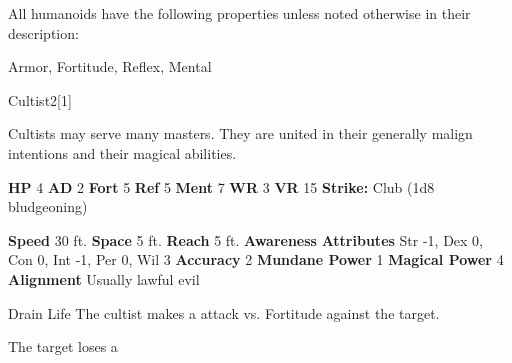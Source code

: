         All humanoids have the following properties unless noted otherwise in their description:
        
    
     Armor,
     Fortitude,
     Reflex,
     Mental
  
  
      
  \begin{monsection}{Cultist}{2}[1]
    \vspace{-1em}\vspace{-1em}
    \vspace{0em}

    
      Cultists may serve many masters.
      They are united in their generally malign intentions and their magical abilities.
    
    

    \begin{spellcontent}
      \begin{spelltargetinginfo}
        \pari \textbf{HP} 4 \monsep
          \textbf{AD} 2 \monsep
          \textbf{Fort} 5 \monsep
          \textbf{Ref} 5 \monsep
          \textbf{Ment} 7
        \pari \textbf{WR} 3 \monsep
        \textbf{VR} 15
        \pari \textbf{Strike:}
            Club  (1d8 bludgeoning)
      \end{spelltargetinginfo}
    \end{spellcontent}
    \begin{monsterfooter}
      \pari \textbf{Speed} 30 ft. \monsep
        \textbf{Space} 5 ft. \monsep
        \textbf{Reach} 5 ft.
      \pari \textbf{Awareness} 
      \pari \textbf{Attributes}
        Str -1, Dex 0,
        Con 0, Int -1,
        Per 0, Wil 3
      \pari \textbf{Accuracy} 2 \monsep
        \textbf{Mundane Power} 1 \monsep
      \textbf{Magical Power} 4
      \pari \textbf{Alignment} Usually lawful evil
    \end{monsterfooter}
  \end{monsection}
  \begin{freeability}{Drain Life}
       The cultist makes a  attack
        vs. Fortitude against the target.
    
    \hit The target loses a 
    \end{freeability}
  

